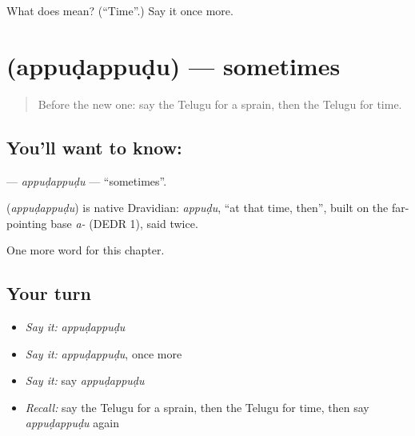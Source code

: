 \begin{tcolorbox}[breakable,colback=teal!4,colframe=teal!35!black,title={Before you move on}]
What does  mean? (\textquotedblleft{}Time\textquotedblright{}.) Say it once more.
\end{tcolorbox}
\section[\texorpdfstring{\te{అప్పుడప్పుడు} (appuḍappuḍu)}{అప్పుడప్పుడు (appuḍappuḍu)}]{ (appuḍappuḍu) — sometimes}

\label{lesson:TE-C170-appudappudu}



\begin{quote}
Before the new one: say the Telugu for a sprain, then the Telugu for time.
\end{quote}

\subsection*{You'll want to know: }
\textbf{} — \emph{appuḍappuḍu} — \textquotedblleft{}sometimes\textquotedblright{}.

\begin{cousinweb}
\textbf{} (\emph{appuḍappuḍu}) is native Dravidian: \emph{appuḍu}, \textquotedblleft{}at that time, then\textquotedblright{}, built on the far-pointing base \emph{a-} (DEDR 1), said twice.
\end{cousinweb}

\begin{grammarlens}[title={What you've built}]
One more word for this chapter.
\end{grammarlens}

\subsection*{Your turn}
\begin{itemize}
\raggedright
  \item \emph{Say it:} \emph{appuḍappuḍu}
  \item \emph{Say it:} \emph{appuḍappuḍu}, once more
  \item \emph{Say it:} say \emph{appuḍappuḍu}
  \item \emph{Recall:} say the Telugu for a sprain, then the Telugu for time, then say \emph{appuḍappuḍu} again
\end{itemize}

